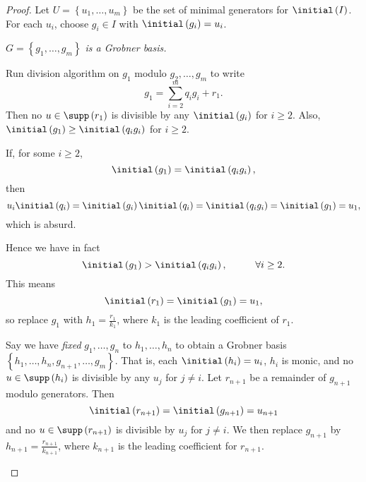 \documentclass[co439]{subfiles}
\begin{document}
    \begin{proof}
        Let $U = \left\lbrace u_1,\ldots,u_m \right\rbrace$ be the set of minimal generators for $\initial\left( I \right)$. For each $u_i$, choose $g_i\in I$ with $\initial\left( g_i \right)= u_i$.

        \begin{claim}
            \textit{$G=\left\lbrace g_1,\ldots,g_m \right\rbrace$ is a Grobner basis.}

            Run division algorithm on $g_1$ modulo $g_2,\ldots,g_m$ to write
            \begin{equation*}
                g_1 = \sum^{m}_{i=2} q_ig_i + r_1.
            \end{equation*}
            Then no $u\in\supp\left( r_1 \right)$ is divisible by any $\initial\left( g_i \right)$ for $i\geq 2$. Also, $\initial\left( g_1 \right) \geq \initial\left( q_ig_i \right)$ for $i\geq 2$. 

            If, for some $i\geq 2$,
            \begin{equation*}
                \initial\left( g_1 \right) = \initial\left( q_ig_i \right),
            \end{equation*}
            then
            \begin{equation*}
                u_i\initial\left( q_i \right) = \initial\left( g_i \right)\initial\left( q_i \right) = \initial\left( q_ig_i \right) = \initial\left( g_1 \right) = u_1,
            \end{equation*}
            which is absurd.

            Hence we have in fact
            \begin{equation*}
                \initial\left( g_1 \right) > \initial\left( q_ig_i \right), \hspace{1cm}\forall i\geq 2.
            \end{equation*}
            This means
            \begin{equation*}
                \initial\left( r_1 \right) = \initial\left( g_1 \right) = u_1,
            \end{equation*}
            so replace $g_1$ with $h_1 = \frac{r_1}{k_1}$, where $k_1$ is the leading coefficient of $r_1$.

            Say we have \textit{fixed} $g_1,\ldots,g_n$ to $h_1,\ldots,h_n$ to obtain a Grobner basis $\left\lbrace h_1,\ldots,h_n,g_{n+1},\ldots,g_m \right\rbrace$. That is, each $\initial\left( h_i \right) = u_i$, $h_i$ is monic, and no $u\in\supp\left( h_i \right)$ is divisible by any $u_j$ for $j\neq i$. Let $r_{n+1}$ be a remainder of $g_{n+1}$ modulo generators. Then
            \begin{equation*}
                \initial\left( r_{n+1} \right) = \initial\left( g_{n+1} \right) = u_{n+1}
            \end{equation*}
            and no $u\in\supp\left( r_{n+1} \right)$ is divisible by $u_j$ for $j\neq i$. We then replace $g_{n+1}$ by $h_{n+1} = \frac{r_{n+1}}{k_{n+1}}$, where $k_{n+1}$ is the leading coefficient for $r_{n+1}$.


\end{claim}
\end{proof}
\end{document}
